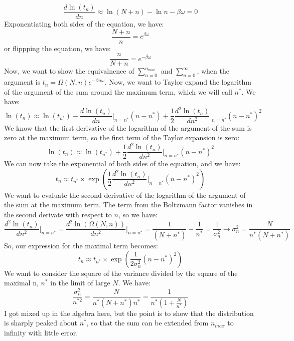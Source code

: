 \documentclass[12pt]{article}
\begin{document}
\begin{equation}
  \frac{d\ln(t_{n})}{dn} \approx \ln (N+n)-\ln n -\beta \omega =0
\end{equation}
Exponentiating both sides of the equation, we have:
\begin{equation}
  \frac{N+n}{n}=e^{\beta \omega}
\end{equation}
or flippping the equation, we have:
\begin{equation}
  \frac{n}{N+n}=e^{-\beta \omega}
\end{equation}
Now, we want to show the equivalnence of $\sum_{n=0}^{n_{max}}$ and $\sum_{n=0}^{\infty}$, when the argument is $t_{n}=\Omega (N,n) e^{-\beta n\omega}$. 
Now, we want to Taylor expand the logarithm of the argument of the sum around the maximum term, which we will call $n^{*}$. We have:
\begin{equation}
  \ln(t_{n}) \approx \ln(t_{n^{*}})-\frac{d\ln(t_{n})}{dn}\bigg|_{n=n^{*}}(n-n^{*})+\frac{1}{2}\frac{d^2\ln(t_{n})}{dn^2}\bigg|_{n=n^{*}}(n-n^{*})^2
\end{equation}
We know that the first derivative of the logarithm of the argument of the sum is zero at the maximum term, so the first term of the Taylor expansion is zero:
\begin{equation}
  \ln(t_{n}) \approx \ln (t_{n^{*}})+\frac{1}{2}\frac{d^2\ln(t_{n})}{dn^2}\bigg|_{n=n^{*}}(n-n^{*})^2
\end{equation}
We can now take the exponential of both sides of the equation, and we have:
\begin{equation}
  t_{n} \approx t_{n^{*}}\times \exp\left(\frac{1}{2}\frac{d^2\ln(t_{n})}{dn^2}\bigg|_{n=n^{*}}(n-n^{*})^2\right)
\end{equation}
We want to evaluate the second derivative of the logarithm of the argument of the sum at the maximum term. The term from the Boltzmann factor vanishes in the second derivate with respect to $n$, so we have:
\begin{equation}
  \frac{d^2\ln(t_{n})}{dn^2}\bigg|_{n=n^{*}}=\frac{d^2\ln(\Omega (N,n))}{dn^2}\bigg|_{n=n^{*}}=\frac{1}{(N+n^{*})}-\frac{1}{n^{*}}=\frac{1}{\sigma _{n}^2}\rightarrow \sigma _{n}^2=\frac{N}{n^{*}(N+n^{*})}
\end{equation}
So, our expression for the maximal term becomes:
\begin{equation}
  t_{n} \approx t_{n^{*}}\times \exp\left(\frac{1}{2\sigma _{n}^2}(n-n^{*})^2\right)
\end{equation}
We want to consider the square of the variance divided by the square of the maximal n, $n^{*}$ in the limit of large $N$. We have:
\begin{equation}
  \frac{\sigma _{n}^2}{n^{*2}}=\frac{N}{n^{*}(N+n^{*})n^{*}}=\frac{1}{n^{*}(1+\frac{N}{n^{*}})}
\end{equation}
I got mixed up in the algebra here, but the point is to show that the distribution is sharply peaked about $n^{*}$, so that the sum can be extended from $n_{max}$ to infinity with little error.
\end{document}
